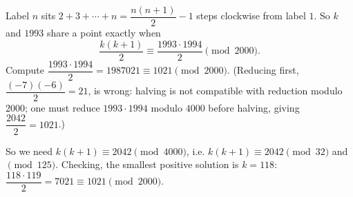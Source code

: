Label $n$ sits $2+3+\cdots+n=\dfrac{n(n+1)}{2}-1$ steps clockwise from label $1$. So $k$ and $1993$ share a point exactly when
\[\dfrac{k(k+1)}{2}\equiv\dfrac{1993\cdot1994}{2}\pmod{2000}.\]
Compute $\dfrac{1993\cdot1994}{2}=1987021\equiv1021\pmod{2000}$. (Reducing first, $\dfrac{(-7)(-6)}{2}=21$, is wrong: halving is not compatible with reduction modulo $2000$; one must reduce $1993\cdot1994$ modulo $4000$ before halving, giving $\dfrac{2042}{2}=1021$.)

So we need $k(k+1)\equiv2042\pmod{4000}$, i.e. $k(k+1)\equiv2042\pmod{32}$ and $\pmod{125}$. Checking, the smallest positive solution is $k=\boxed{118}$: $\dfrac{118\cdot119}{2}=7021\equiv1021\pmod{2000}$.
